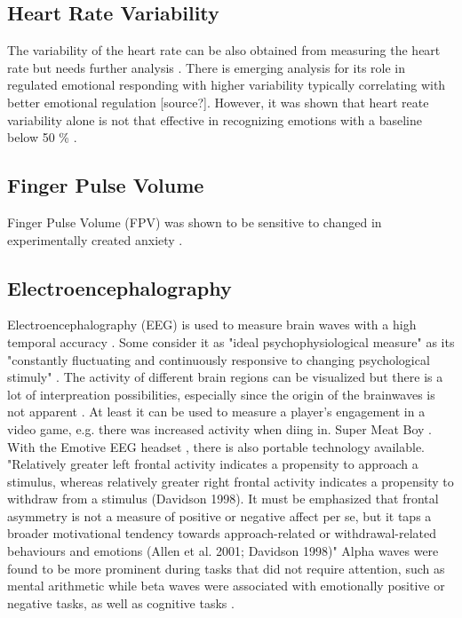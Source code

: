 \subsection{Heart Rate Variability}
The variability of the heart rate can be also obtained from measuring the heart rate but needs further analysis \cite{nacke2015physiological}. There is emerging analysis for its role in regulated emotional responding \cite{appelhans2006heat} with higher variability typically correlating with better emotional regulation [source?]. However, it was shown that heart reate variability alone is not that effective in recognizing emotions with a baseline below 50 \% \cite{ferdinando2014emotion}.


\subsection{Finger Pulse Volume}
Finger Pulse Volume (FPV) was shown to be sensitive to changed in experimentally created anxiety \cite{bloom77finger}.

\subsection{Electroencephalography}
Electroencephalography (EEG) is used to measure brain waves with a high temporal accuracy \cite{nacke2015physiological}. Some consider it as "ideal psychophysiological measure" as its "constantly fluctuating and continuously responsive to changing psychological stimuly" \cite{hatfield87psychophysiology}. The activity of different brain regions can be visualized but there is a lot of interpreation possibilities, especially since the origin of the brainwaves is not apparent \cite{nacke2015physiological}. At least it can be used to measure a player's engagement in a video game, e.g. there was increased activity when diing in. Super Meat Boy \cite{mcmahan2018evaluating}. With the Emotive EEG headset \cite{link_emotiv}, there is also portable technology available.
"Relatively greater left frontal activity indicates a propensity to approach a stimulus, whereas relatively greater right frontal activity indicates a propensity to withdraw from a stimulus (Davidson 1998). It must be emphasized that
frontal asymmetry is not a measure of positive or negative affect per se, but it taps a broader motivational tendency towards approach-related or withdrawal-related behaviours and emotions (Allen et al. 2001; Davidson 1998)" \cite{kivikangas2011review}
Alpha waves were found to be more prominent during tasks that did not require attention, such as mental arithmetic while beta waves were associated with emotionally positive or negative tasks, as well as cognitive tasks \cite{ray85eeg}.


